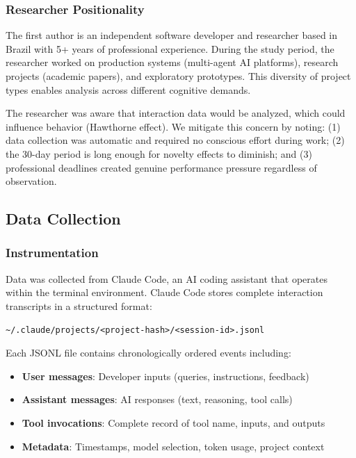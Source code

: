 \subsubsection{Researcher Positionality}

The first author is an independent software developer and researcher based in Brazil with 5+ years of professional experience. During the study period, the researcher worked on production systems (multi-agent AI platforms), research projects (academic papers), and exploratory prototypes. This diversity of project types enables analysis across different cognitive demands.

The researcher was aware that interaction data would be analyzed, which could influence behavior (Hawthorne effect). We mitigate this concern by noting: (1) data collection was automatic and required no conscious effort during work; (2) the 30-day period is long enough for novelty effects to diminish; and (3) professional deadlines created genuine performance pressure regardless of observation.

\subsection{Data Collection}

\subsubsection{Instrumentation}

Data was collected from Claude Code, an AI coding assistant that operates within the terminal environment. Claude Code stores complete interaction transcripts in a structured format:

\begin{lstlisting}[caption={Session storage location}]
~/.claude/projects/<project-hash>/<session-id>.jsonl
\end{lstlisting}

Each JSONL file contains chronologically ordered events including:
\begin{itemize}
    \item \textbf{User messages}: Developer inputs (queries, instructions, feedback)
    \item \textbf{Assistant messages}: AI responses (text, reasoning, tool calls)
    \item \textbf{Tool invocations}: Complete record of tool name, inputs, and outputs
    \item \textbf{Metadata}: Timestamps, model selection, token usage, project context
\end{itemize}

